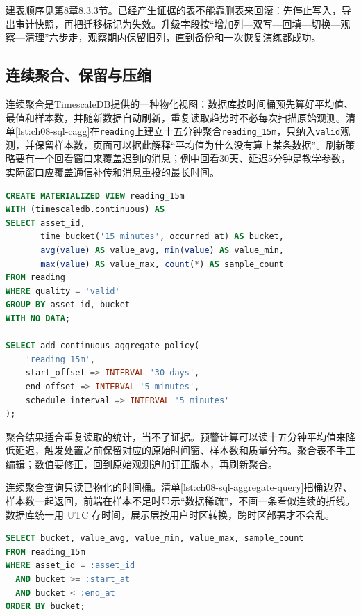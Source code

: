 建表顺序见第8章8.3.3节。已经产生证据的表不能靠删表来回滚：先停止写入，导出审计快照，再把迁移标记为失效。升级字段按“增加列—双写—回填—切换—观察—清理”六步走，观察期内保留旧列，直到备份和一次恢复演练都成功。

\subsection{连续聚合、保留与压缩}

连续聚合是TimescaleDB提供的一种物化视图：数据库按时间桶预先算好平均值、最值和样本数，并随新数据自动刷新，重复读取趋势时不必每次扫描原始观测。清单\ref{lst:ch08-sql-cagg}在\texttt{reading}上建立十五分钟聚合\texttt{reading\_15m}，只纳入\texttt{valid}观测，并保留样本数，页面可以据此解释“平均值为什么没有算上某条数据”。刷新策略要有一个回看窗口来覆盖迟到的消息；例中回看30天、延迟5分钟是教学参数，实际窗口应覆盖通信补传和消息重投的最长时间。

\begin{lstlisting}[label={lst:ch08-sql-cagg},language=SQL,caption={十五分钟连续聚合视图与刷新策略}]
CREATE MATERIALIZED VIEW reading_15m
WITH (timescaledb.continuous) AS
SELECT asset_id,
       time_bucket('15 minutes', occurred_at) AS bucket,
       avg(value) AS value_avg, min(value) AS value_min,
       max(value) AS value_max, count(*) AS sample_count
FROM reading
WHERE quality = 'valid'
GROUP BY asset_id, bucket
WITH NO DATA;

SELECT add_continuous_aggregate_policy(
    'reading_15m',
    start_offset => INTERVAL '30 days',
    end_offset => INTERVAL '5 minutes',
    schedule_interval => INTERVAL '5 minutes'
);
\end{lstlisting}

聚合结果适合重复读取的统计，当不了证据。预警计算可以读十五分钟平均值来降低延迟，触发处置之前保留对应的原始时间窗、样本数和质量分布。聚合表不手工编辑；数值要修正，回到原始观测追加订正版本，再刷新聚合。

连续聚合查询只读已物化的时间桶。清单\ref{lst:ch08-sql-aggregate-query}把桶边界、样本数一起返回，前端在样本不足时显示“数据稀疏”，不画一条看似连续的折线。数据库统一用 UTC 存时间，展示层按用户时区转换，跨时区部署才不会乱。

\begin{lstlisting}[label={lst:ch08-sql-aggregate-query},language=SQL,caption={读取十五分钟连续聚合结果}]
SELECT bucket, value_avg, value_min, value_max, sample_count
FROM reading_15m
WHERE asset_id = :asset_id
  AND bucket >= :start_at
  AND bucket < :end_at
ORDER BY bucket;
\end{lstlisting}

